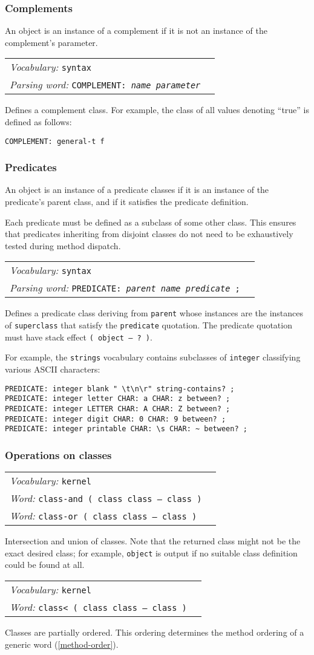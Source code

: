 \documentclass{book}
\newcommand{\vocabulary}[1]{\emph{Vocabulary:} \texttt{#1}&\\}
\newcommand{\parsingword}[2]{\index{\texttt{#1}}\emph{Parsing word:} \texttt{#2}&\\}
\newcommand{\ordinaryword}[2]{\index{\texttt{#1}}\emph{Word:} \texttt{#2}&\\}
\newcommand{\wordtable}[1]{


\begin{tabularx}{12cm}{lX}
\hline
#1
\hline
\end{tabularx}

}
\begin{document}
\subsubsection{Complements}

An object is an instance of a complement if it is not an instance of the complement's parameter.
\wordtable{
\vocabulary{syntax}
\parsingword{COMPLEMENT:}{COMPLEMENT: \emph{name} \emph{parameter}}
}
Defines a complement class. For example, the class of all values denoting ``true'' is defined as follows:
\begin{verbatim}
COMPLEMENT: general-t f
\end{verbatim}

\subsubsection{Predicates}
An object is an instance of a predicate classes if it is an instance of the predicate's parent class, and if it satisfies the predicate definition.

Each predicate must be
defined as a subclass of some other class. This ensures that predicates inheriting from disjoint classes do not need to be
exhaustively tested during method dispatch.
\wordtable{
\vocabulary{syntax}
\parsingword{PREDICATE:}{PREDICATE: \emph{parent} \emph{name} \emph{predicate} ;}
}
Defines a predicate class deriving from \texttt{parent} whose instances are the instances of \texttt{superclass} that satisfy the \texttt{predicate} quotation. The predicate quotation must have stack effect \texttt{( object -- ?~)}.

For example, the \texttt{strings} vocabulary contains subclasses of \texttt{integer}
classifying various ASCII characters:
\begin{verbatim}
PREDICATE: integer blank " \t\n\r" string-contains? ;
PREDICATE: integer letter CHAR: a CHAR: z between? ;
PREDICATE: integer LETTER CHAR: A CHAR: Z between? ;
PREDICATE: integer digit CHAR: 0 CHAR: 9 between? ;
PREDICATE: integer printable CHAR: \s CHAR: ~ between? ;
\end{verbatim}

\subsubsection{Operations on classes}
\wordtable{
\vocabulary{kernel}
\ordinaryword{class-and}{class-and ( class class -- class )}
\ordinaryword{class-or}{class-or ( class class -- class )}

}
Intersection and union of classes. Note that the returned class might not be the exact desired class; for example, \texttt{object} is output if no suitable class definition could be found at all.
\wordtable{
\vocabulary{kernel}
\ordinaryword{class<}{class< ( class class -- class )}
}
Classes are partially ordered. This ordering determines the method ordering of a generic word (\ref{method-order}).
\end{document}
